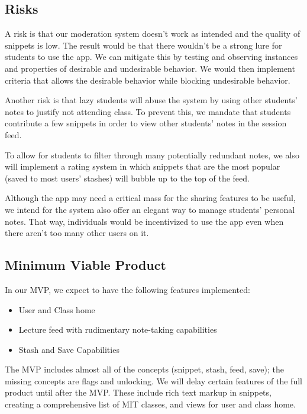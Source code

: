 \documentclass{article}
\begin{document}
\newpage

\subsection*{Risks}

A risk is that our moderation system doesn't work as intended and the quality of snippets is low. The result would be that there wouldn't be a strong lure for students to use the app. We can mitigate this by testing and observing instances and properties of desirable and undesirable behavior. We would then implement criteria that allows the desirable behavior while blocking undesirable behavior.

Another risk is that lazy students will abuse the system by using other students' notes to justify not attending class. To prevent this, we mandate that students contribute a few snippets in order to view other students' notes in the session feed.

To allow for students to filter through many potentially redundant notes, we also will implement a rating system in which snippets that are the most popular (saved to most users' stashes) will bubble up to the top of the feed.

Although the app may need a critical mass for the sharing features to be useful, we intend for the system also offer an elegant way to manage students' personal notes. That way, individuals would be incentivized to use the app even when there aren't too many other users on it.

\subsection*{Minimum Viable Product}
In our MVP, we expect to have the following features implemented:
\begin{itemize}
\item User and Class home
\item Lecture feed with rudimentary note-taking capabilities
\item Stash and Save Capabilities
\end{itemize}

The MVP includes almost all of the concepts (snippet, stash, feed, save); the missing concepts are flags and unlocking. We will delay certain features of the full product until after the MVP. These include rich text markup in snippets, creating a comprehensive list of MIT classes, and views for user and class home.
\end{document}
